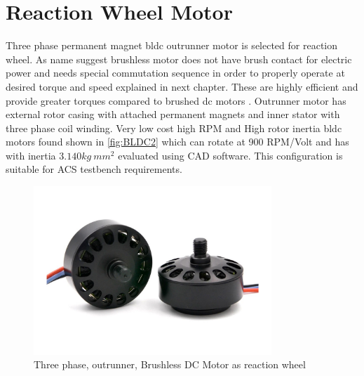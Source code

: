 \section{Reaction Wheel Motor}
Three phase permanent magnet \acrfull{bldc} outrunner motor is selected for reaction wheel. As name suggest brushless motor does not have brush contact for electric power and needs special commutation sequence in order to properly operate at desired torque and speed explained in next chapter. These are highly efficient and provide greater torques compared to brushed dc motors \cite{bldc}. Outrunner motor has external rotor casing with attached permanent magnets and inner stator with three phase coil winding. Very low cost high RPM and High rotor inertia \acrshort{bldc} motors found shown in \autoref{fig:BLDC2} which can rotate at 900 RPM/Volt and has with inertia $3.140 kg \ mm^2$ evaluated using CAD software. This configuration is suitable for ACS testbench requirements.
\begin{figure}[ht]
    \centering
    \includegraphics[width=0.80\textwidth]{figures/Assembly/BLDC2.pdf}
    \caption{Three phase, outrunner, Brushless DC Motor as reaction wheel}
    \label{fig:BLDC2}
\end{figure}

